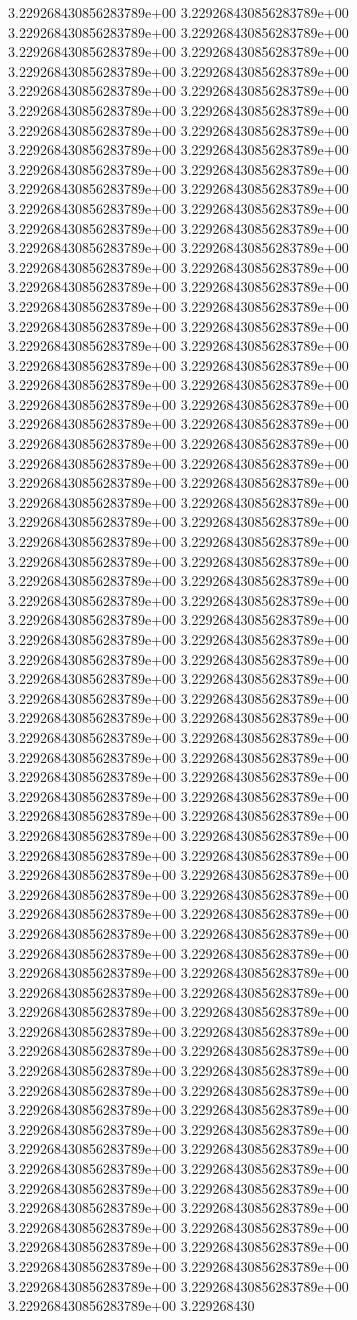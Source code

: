 3.229268430856283789e+00	3.229268430856283789e+00	3.229268430856283789e+00	3.229268430856283789e+00	3.229268430856283789e+00	3.229268430856283789e+00	3.229268430856283789e+00	3.229268430856283789e+00	3.229268430856283789e+00	3.229268430856283789e+00	3.229268430856283789e+00	3.229268430856283789e+00	3.229268430856283789e+00	3.229268430856283789e+00	3.229268430856283789e+00	3.229268430856283789e+00	3.229268430856283789e+00	3.229268430856283789e+00	3.229268430856283789e+00	3.229268430856283789e+00	3.229268430856283789e+00	3.229268430856283789e+00	3.229268430856283789e+00	3.229268430856283789e+00	3.229268430856283789e+00	3.229268430856283789e+00	3.229268430856283789e+00	3.229268430856283789e+00	3.229268430856283789e+00	3.229268430856283789e+00	3.229268430856283789e+00	3.229268430856283789e+00	3.229268430856283789e+00	3.229268430856283789e+00	3.229268430856283789e+00	3.229268430856283789e+00	3.229268430856283789e+00	3.229268430856283789e+00	3.229268430856283789e+00	3.229268430856283789e+00	3.229268430856283789e+00	3.229268430856283789e+00	3.229268430856283789e+00	3.229268430856283789e+00	3.229268430856283789e+00	3.229268430856283789e+00	3.229268430856283789e+00	3.229268430856283789e+00	3.229268430856283789e+00	3.229268430856283789e+00	3.229268430856283789e+00	3.229268430856283789e+00	3.229268430856283789e+00	3.229268430856283789e+00	3.229268430856283789e+00	3.229268430856283789e+00	3.229268430856283789e+00	3.229268430856283789e+00	3.229268430856283789e+00	3.229268430856283789e+00	3.229268430856283789e+00	3.229268430856283789e+00	3.229268430856283789e+00	3.229268430856283789e+00	3.229268430856283789e+00	3.229268430856283789e+00	3.229268430856283789e+00	3.229268430856283789e+00	3.229268430856283789e+00	3.229268430856283789e+00	3.229268430856283789e+00	3.229268430856283789e+00	3.229268430856283789e+00	3.229268430856283789e+00	3.229268430856283789e+00	3.229268430856283789e+00	3.229268430856283789e+00	3.229268430856283789e+00	3.229268430856283789e+00	3.229268430856283789e+00	3.229268430856283789e+00	3.229268430856283789e+00	3.229268430856283789e+00	3.229268430856283789e+00	3.229268430856283789e+00	3.229268430856283789e+00	3.229268430856283789e+00	3.229268430856283789e+00	3.229268430856283789e+00	3.229268430856283789e+00	3.229268430856283789e+00	3.229268430856283789e+00	3.229268430856283789e+00	3.229268430856283789e+00	3.229268430856283789e+00	3.229268430856283789e+00	3.229268430856283789e+00	3.229268430856283789e+00	3.229268430856283789e+00	3.229268430856283789e+00	3.229268430856283789e+00	3.229268430856283789e+00	3.229268430856283789e+00	3.229268430856283789e+00	3.229268430856283789e+00	3.229268430856283789e+00	3.229268430856283789e+00	3.229268430856283789e+00	3.229268430856283789e+00	3.229268430856283789e+00	3.229268430856283789e+00	3.229268430856283789e+00	3.229268430856283789e+00	3.229268430856283789e+00	3.229268430856283789e+00	3.229268430856283789e+00	3.229268430856283789e+00	3.229268430856283789e+00	3.229268430856283789e+00	3.229268430856283789e+00	3.229268430856283789e+00	3.229268430856283789e+00	3.229268430856283789e+00	3.229268430856283789e+00	3.229268430856283789e+00	3.229268430856283789e+00	3.229268430856283789e+00	3.229268430856283789e+00	3.229268430856283789e+00	3.229268430856283789e+00	3.229268430856283789e+00	3.229268430856283789e+00	3.229268430856283789e+00	3.229268430